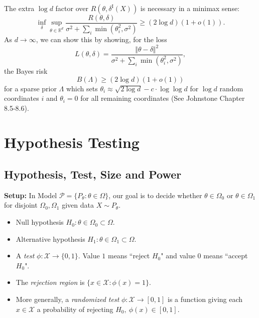 \documentclass[a4paper]{article}
\begin{document}
\begin{remark}
	The extra $\log d$ factor over $R(\theta,\delta^{\text{I}}(X))$ is necessary in a minimax sense:
	\begin{equation}
		\inf\limits_{\delta} \sup\limits_{\theta \in \mathbb{R}^d} \frac{R(\theta,\delta)}{\sigma^2 + \sum\limits_i \min (\theta_i^2,\sigma^2)} \geq (2\log d)(1+o(1)).
	\end{equation}
	As $d \to \infty$, we can show this by showing, for the loss
	\begin{equation}
		L(\theta,\delta) = \frac{\Vert \theta - \delta \Vert ^2}{\sigma^2 + \sum\limits_i \min (\theta_i^2,\sigma^2)},
	\end{equation}
	the Bayes risk
	\begin{equation}
		B(\Lambda) \geq (2\log d)(1 + o(1))
	\end{equation}
	for a sparse prior $\Lambda$ which sets $\theta_i \approx \sqrt{2 \log d} - c \cdot \log \log d$ for $\log d$ random coordinates $i$ and $\theta_i = 0$ for all remaining coordinates (See Johnstone Chapter 8.5-8.6).
\end{remark}

\section{Hypothesis Testing}

\subsection{Hypothesis, Test, Size and Power}
\textbf{Setup:} In Model $\mathcal{P} = \{P_\theta: \theta \in \Omega \}$, our goal is to decide whether $\theta \in \Omega_0$ or $\theta \in \Omega_1$ for disjoint $\Omega_0, \Omega_1$ given data $X\sim P_\theta$.

\begin{itemize}
	\item Null hypothesis $H_0: \theta \in \Omega_0 \subset \Omega$.
	\item Alternative hypothesis $H_1: \theta \in \Omega_1 \subset \Omega$.
\end{itemize}

\begin{defi}
	\quad
	\begin{itemize}
		\item A \emph{test} $\phi: \mathcal{X} \to \{0,1\}$. Value $1$ means ``reject $H_0$" and value $0$ means ``accept $H_0$". 
		\item The \emph{rejection region} is $\{x \in \mathcal{X}: \phi(x) = 1\}$. 
		\item More generally, a \emph{randomized test} $\phi: \mathcal{X} \to [0,1]$ is a function giving each $x \in \mathcal{X}$ a probability of rejecting $H_0, \ \phi(x) \in [0,1]$.
	\end{itemize}
\end{defi}
\end{document}
